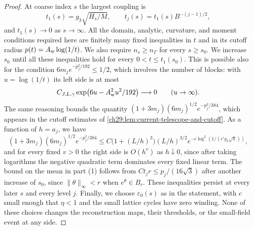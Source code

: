 \begin{proof}
At coarse index $s$ the largest coupling is
\begin{equation}\label{ch28:eq:largest-integrated-coupling}
 t_1(s)=g_3\sqrt{H_s/M},\qquad t_j(s)=t_1(s)B^{-(j-1)/2},
\end{equation}
and $t_1(s)\to0$ as $s\to\infty$. All the domain, analytic, curvature, and moment conditions required here are finitely many fixed inequalities in $t$ and in its cutoff radius $p(t)=A_{\rm w}\log(1/t)$. We also require $n_s\ge n_\Gamma$ for every $s\ge s_0$. We increase $s_0$ until all these inequalities hold for every $0<t\le t_1(s_0)$. This is possible also for the condition $6m_je^{-p_j^2/192}\le1/2$, which involves the number of blocks: with $u=\log(1/t)$ its left side is at most
\[
 C_{J,L,\gamma}\exp\bigl(6u-A_{\rm w}^2u^2/192\bigr)\longrightarrow0\qquad(u\to\infty).
\]
The same reasoning bounds the quantity $(1+3m_j)(6m_j)^{1/2}e^{-p_j^2/384}$, which appears in the cutoff estimates of \cref{ch29:lem:current-telescope-and-cutoff}. As a function of $h=a_j$, we have
\begin{equation}\label{ch28:eq:cutoff-envelope}
 (1+3m_j)(6m_j)^{1/2}e^{-p_j^2/384}\le C\bigl(1+(L/h)^3\bigr)(L/h)^{3/2}e^{-c\log^2(1/(c'g_3\sqrt h))},
\end{equation}
and for every fixed $v>0$ the right side is $O(h^v)$ as $h\downarrow0$, since after taking logarithms the negative quadratic term dominates every fixed linear term. The bound on the mean in part (1) follows from $Ct_jr\le p_j/(16\sqrt3)$ after another increase of $s_0$, since $\|\theta\|_\infty<r$ when $e^\theta\in B_r$. These inequalities persist at every later $s$ and every level $j$. Finally, we choose $\varepsilon_0(s)$ as in the statement, with $c$ small enough that $\eta<1$ and the small lattice cycles have zero winding. None of these choices changes the reconstruction maps, their thresholds, or the small-field event at any side.


\end{proof}
